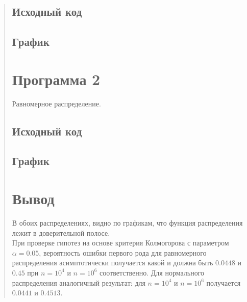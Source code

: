 \documentclass{article}
\begin{document}
\begin{quote}
\subsection{Исходный код}
        \begin{minipage}{\linewidth}
            
        \end{minipage}
\subsection{График}

\section{Программа 2}
	Равномерное распределение.
\subsection{Исходный код}
        \begin{minipage}{\linewidth}
	    
        \end{minipage}
\subsection{График}

\section{Вывод}
	В обоих распределениях, видно по графикам, что функция распределения лежит в доверительной полосе.\\
	При проверке гипотез на основе критерия Колмогорова с параметром $\alpha = 0.05$, вероятность ошибки первого рода для равномерного распределения асимптотически получается какой и должна быть $0.0448$ и $0.45$ при $n=10^4$ и $n=10^6$ соответственно. Для нормального распределения аналогичный результат: для $n=10^4$ и $n=10^6$ получается $0.0441$ и $0.4513$.
\end{quote}
\end{document}
